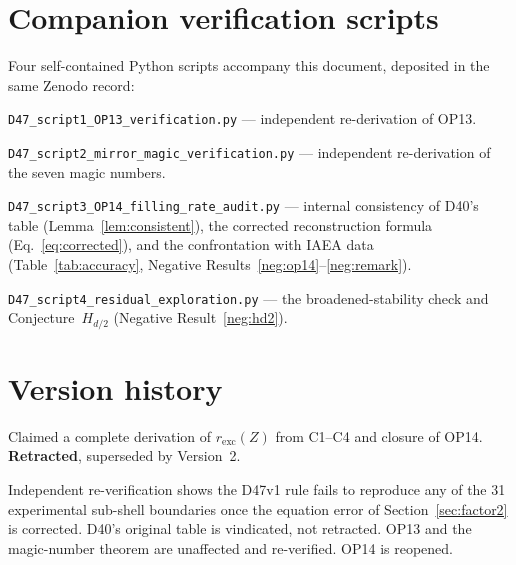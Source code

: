 \documentclass[12pt,a4paper]{article}
\theoremstyle{plain}
\theoremstyle{definition}
\theoremstyle{remark}
\newcommand{\rexc}{r_{\mathrm{exc}}}
\begin{document}
\section{Companion verification scripts}
\label{app:scripts}
Four self-contained Python scripts accompany this document, deposited in the same Zenodo record:
\begin{description}[nosep]
\item[Script~1] \texttt{D47\_script1\_OP13\_verification.py} --- independent re-derivation of OP13.
\item[Script~2] \texttt{D47\_script2\_mirror\_magic\_verification.py} --- independent re-derivation of the seven magic numbers.
\item[Script~3] \texttt{D47\_script3\_OP14\_filling\_rate\_audit.py} --- internal consistency of D40's table (Lemma~\ref{lem:consistent}), the corrected reconstruction formula (Eq.~\eqref{eq:corrected}), and the confrontation with IAEA data (Table~\ref{tab:accuracy}, Negative Results~\ref{neg:op14}--\ref{neg:remark}).
\item[Script~4] \texttt{D47\_script4\_residual\_exploration.py} --- the broadened-stability check and Conjecture~$H_{d/2}$ (Negative Result~\ref{neg:hd2}).
\end{description}

\section{Version history}
\label{app:versions}
\begin{description}[nosep]
\item[Version~1] Claimed a complete derivation of $\rexc(Z)$ from C1--C4 and closure of OP14. \textbf{Retracted}, superseded by Version~2.
\item[Version~2] Independent re-verification shows the D47v1 rule fails to reproduce any of the 31 experimental sub-shell boundaries once the equation error of Section~\ref{sec:factor2} is corrected. D40's original table is vindicated, not retracted. OP13 and the magic-number theorem are unaffected and re-verified. OP14 is reopened.
\end{description}



\end{document}
